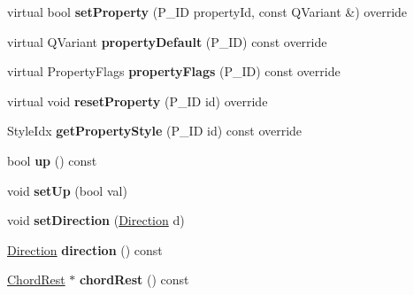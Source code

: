 \begin{DoxyCompactItemize}
virtual bool {\bfseries set\+Property} (P\+\_\+\+ID property\+Id, const Q\+Variant \&) override
\item 
\mbox{\label{class_ms_1_1_articulation_a5f08d236aca0ac193483e8130ac4ca15}} 
virtual Q\+Variant {\bfseries property\+Default} (P\+\_\+\+ID) const override
\item 
\mbox{\label{class_ms_1_1_articulation_ae2fb19f69518dfa726fd2e0481335cc0}} 
virtual Property\+Flags {\bfseries property\+Flags} (P\+\_\+\+ID) const override
\item 
\mbox{\label{class_ms_1_1_articulation_a130104c1c68d4b7f61cf39b1cf074a7d}} 
virtual void {\bfseries reset\+Property} (P\+\_\+\+ID id) override
\item 
\mbox{\label{class_ms_1_1_articulation_a97e5de808ded05f325b45c6804b1628c}} 
Style\+Idx {\bfseries get\+Property\+Style} (P\+\_\+\+ID id) const override
\item 
\mbox{\label{class_ms_1_1_articulation_a3eb46109267882cfca14ea94f1aab632}} 
bool {\bfseries up} () const
\item 
\mbox{\label{class_ms_1_1_articulation_a9f8bcd782a86f98c168bca5cddf08306}} 
void {\bfseries set\+Up} (bool val)
\item 
\mbox{\label{class_ms_1_1_articulation_a76322e2fed526622424d423fa6300ad8}} 
void {\bfseries set\+Direction} (\hyperlink{class_ms_1_1_direction}{Direction} d)
\item 
\mbox{\label{class_ms_1_1_articulation_a17dd42a2500c9b5bd6186d2f6d61877c}} 
\hyperlink{class_ms_1_1_direction}{Direction} {\bfseries direction} () const
\item 
\mbox{\label{class_ms_1_1_articulation_ad04cbfdde0a9fa383232917468595080}} 
\hyperlink{class_ms_1_1_chord_rest}{Chord\+Rest} $\ast$ {\bfseries chord\+Rest} () const
\item 
\mbox{\label{class_ms_1_1_articulation_a6b4d70ed862642e235ffc51bd333e8d2}} 

\end{DoxyCompactItemize}
